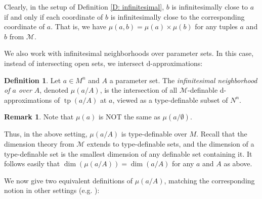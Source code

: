 \documentclass{amsart}
\theoremstyle{definition}
\newtheorem{definition}[theorem]{Definition}
\newtheorem{remark}[theorem]{Remark}
\newcommand{\tp}{\operatorname{tp}}
\begin{document}
Clearly, in the setup of Definition \ref{D: infinitesimal}, $b$ is infinitesimally close to $a$ if and only if each coordinate of $b$ is infinitesimally close to the corresponding coordinate of $a$. That is, we have $\mu(a,b)=\mu(a)\times\mu(b)$ for any tuples $a$ and $b$ from $\mathcal M$.

We also work with infinitesimal neighborhoods over parameter sets. In this case, instead of intersecting open sets, we intersect d-approximations:

\begin{definition}\label{D: inf neigh}
    Let $a\in M^n$ and $A$ a parameter set. The \textit{infinitesimal neighborhood of $a$ over $A$}, denoted $\mu(a/A)$, is the intersection of all $\mathcal M$-definable d-approximations of $\tp(a/A)$ at $a$, viewed as a type-definable subset of $N^n$.
    \end{definition}

    \begin{remark}
        Note that $\mu(a)$ is NOT the same as $\mu(a/\emptyset)$.
    \end{remark}

    Thus, in the above setting, $\mu(a/A)$ is type-definable over $M$. Recall that the dimension theory from $\mathcal M$ extends to type-definable sets, and the dimension of a type-definable set is the smallest dimension of any definable set containing it. It follows easily that $\dim(\mu(a/A))=\dim(a/A)$ for any $a$ and $A$ as above.

   
    We now give two equivalent definitions of $\mu(a/A)$, matching the corresponding notion in other settings (e.g. \cite{PetGconf}):
\end{document}
